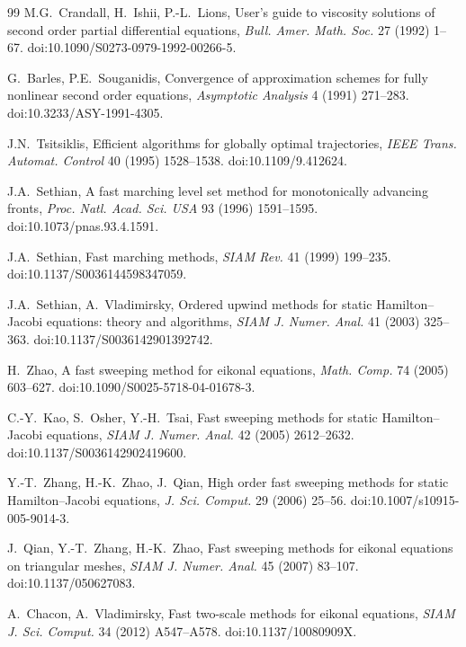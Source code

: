 \documentclass[preprint,12pt]{elsarticle}
\begin{document}
\small
\begin{thebibliography}{99}
M.G.~Crandall, H.~Ishii, P.-L.~Lions,
User's guide to viscosity solutions of second order partial differential equations,
\emph{Bull. Amer. Math. Soc.} 27 (1992) 1--67.
\newblock doi:10.1090/S0273-0979-1992-00266-5.

G.~Barles, P.E.~Souganidis,
Convergence of approximation schemes for fully nonlinear second order equations,
\emph{Asymptotic Analysis} 4 (1991) 271--283.
\newblock doi:10.3233/ASY-1991-4305.

J.N.~Tsitsiklis,
Efficient algorithms for globally optimal trajectories,
\emph{IEEE Trans. Automat. Control} 40 (1995) 1528--1538.
\newblock doi:10.1109/9.412624.

J.A.~Sethian,
A fast marching level set method for monotonically advancing fronts,
\emph{Proc. Natl. Acad. Sci. USA} 93 (1996) 1591--1595.
\newblock doi:10.1073/pnas.93.4.1591.

J.A.~Sethian,
Fast marching methods,
\emph{SIAM Rev.} 41 (1999) 199--235.
\newblock doi:10.1137/S0036144598347059.

J.A.~Sethian, A.~Vladimirsky,
Ordered upwind methods for static Hamilton--Jacobi equations: theory and algorithms,
\emph{SIAM J. Numer. Anal.} 41 (2003) 325--363.
\newblock doi:10.1137/S0036142901392742.

H.~Zhao,
A fast sweeping method for eikonal equations,
\emph{Math. Comp.} 74 (2005) 603--627.
\newblock doi:10.1090/S0025-5718-04-01678-3.

C.-Y.~Kao, S.~Osher, Y.-H.~Tsai,
Fast sweeping methods for static Hamilton--Jacobi equations,
\emph{SIAM J. Numer. Anal.} 42 (2005) 2612--2632.
\newblock doi:10.1137/S0036142902419600.

Y.-T.~Zhang, H.-K.~Zhao, J.~Qian,
High order fast sweeping methods for static Hamilton--Jacobi equations,
\emph{J. Sci. Comput.} 29 (2006) 25--56.
\newblock doi:10.1007/s10915-005-9014-3.

J.~Qian, Y.-T.~Zhang, H.-K.~Zhao,
Fast sweeping methods for eikonal equations on triangular meshes,
\emph{SIAM J. Numer. Anal.} 45 (2007) 83--107.
\newblock doi:10.1137/050627083.

A.~Chacon, A.~Vladimirsky,
Fast two-scale methods for eikonal equations,
\emph{SIAM J. Sci. Comput.} 34 (2012) A547--A578.
\newblock doi:10.1137/10080909X.


\end{thebibliography}
\end{document}
